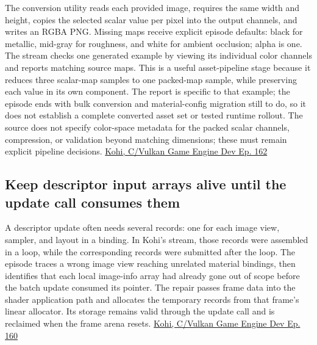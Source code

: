 The conversion utility reads each provided image, requires the same width and height, copies the selected scalar value per pixel into the output channels, and writes an RGBA PNG. Missing maps receive explicit episode defaults: black for metallic, mid-gray for roughness, and white for ambient occlusion; alpha is one. The stream checks one generated example by viewing its individual color channels and reports matching source maps. This is a useful asset-pipeline stage because it reduces three scalar-map samples to one packed-map sample, while preserving each value in its own component. The report is specific to that example; the episode ends with bulk conversion and material-config migration still to do, so it does not establish a complete converted asset set or tested runtime rollout. The source does not specify color-space metadata for the packed scalar channels, compression, or validation beyond matching dimensions; these must remain explicit pipeline decisions. \href{https://www.youtube.com/watch?v=C2zceJ88k7w}{Kohi, C/Vulkan Game Engine Dev Ep. 162}

\subsection{Keep descriptor input arrays alive until the update call consumes them}\label{06-engine-ii-ch026-keep-descriptor-input-arrays-alive-until-the-update-call-consumes-them}

\hypertarget{06-engine-ii-ch026-keep-descriptor-input-arrays-alive-until-the-update-call-consumes-them}{}

A descriptor update often needs several  records: one for each image view, sampler, and layout in a binding. In Kohi's stream, those records were assembled in a loop, while the corresponding  records were submitted after the loop. The episode traces a wrong image view reaching unrelated material bindings, then identifies that each local image-info array had already gone out of scope before the batch update consumed its pointer. The repair passes frame data into the shader application path and allocates the temporary records from that frame's linear allocator. Its storage remains valid through the update call and is reclaimed when the frame arena resets. \href{https://www.youtube.com/watch?v=Zcxl3BmmxJA}{Kohi, C/Vulkan Game Engine Dev Ep. 160}

